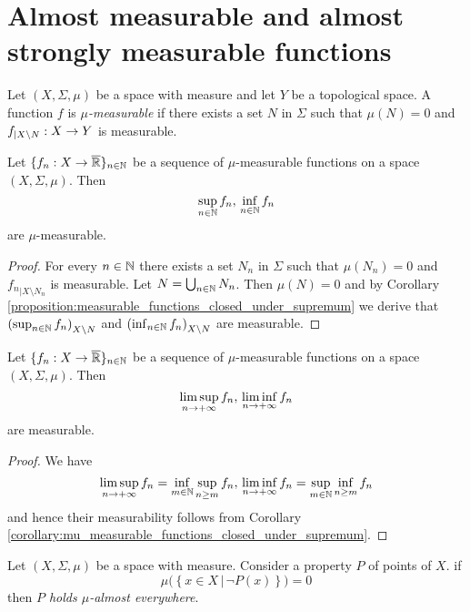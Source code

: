 \section{Almost measurable and almost strongly measurable functions}

\begin{definition}
Let $(X,\Sigma,\mu)$ be a space with measure and let $Y$ be a topological space. A function $f$ is \textit{$\mu$-measurable} if there exists a set $N$ in $\Sigma$ such that $\mu(N) = 0$ and $f_{\mid X\setminus N}:X\rightarrow Y$ is measurable.
\end{definition}

\begin{corollary}\label{corollary:mu_measurable_functions_closed_under_supremum}
Let $\{f_n:X\rightarrow \overline{{\mathbb R}}\}_{n\in {\mathbb N}}$ be a sequence of $\mu$-measurable functions on a space $(X,\Sigma,\mu)$. Then
$$\sup_{n\in {\mathbb N}}f_n,\,\inf_{n\in {\mathbb N}}f_n$$
are $\mu$-measurable.
\end{corollary}
\begin{proof}
For every $n\in {\mathbb N}$ there exists a set $N_n$ in $\Sigma$ such that $\mu(N_n) = 0$ and ${f_n}_{\mid X\setminus N_n}$ is measurable. Let $N = \bigcup_{n\in {\mathbb N}}N_n$. Then $\mu(N) = 0$ and by Corollary \ref{proposition:measurable_functions_closed_under_supremum} we derive that $\left(\sup_{n\in {\mathbb N}}f_n\right)_{X\setminus N}$ and $\left(\inf_{n\in {\mathbb N}}f_n\right)_{X\setminus N}$ are measurable.
\end{proof}

\begin{corollary}\label{corollary:mu_measurable_closed_under_upper_limits}
Let $\{f_n:X\rightarrow \overline{{\mathbb R}}\}_{n\in {\mathbb N}}$ be a sequence of $\mu$-measurable functions on a space $(X,\Sigma,\mu)$. Then
$$\limsup_{n\rightarrow +\infty}f_n,\,\liminf_{n\rightarrow +\infty}f_n$$
are measurable.
\end{corollary}
\begin{proof}
We have
$$\limsup_{n\rightarrow +\infty}f_n =\inf_{m\in {\mathbb N}}\sup_{n\geq m}f_n,\,\liminf_{n\rightarrow +\infty}f_n = \sup_{m\in {\mathbb N}}\inf_{n\geq m}f_n$$
and hence their measurability follows from Corollary \ref{corollary:mu_measurable_functions_closed_under_supremum}.
\end{proof}

\begin{definition}
Let $(X,\Sigma,\mu)$ be a space with measure. Consider a property $P$ of points of $X$. if
$$\mu\bigg(\left\{x\in X\,|\,\neg P(x)\right\}\bigg) = 0$$
then \textit{$P$ holds $\mu$-almost everywhere}.
\end{definition}

